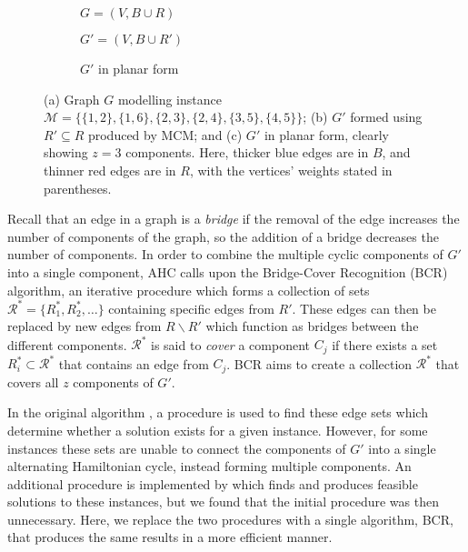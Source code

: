 \documentclass[authoryear]{elsarticle}
\begin{document}
\begin{figure}[H]	
	\centering
	\begin{subfigure}[h]{0.3\textwidth}
		
		\caption{$G = (V, B \cup R)$}
		\label{fig:threshold}
	\end{subfigure} \hspace{5mm}
	\begin{subfigure}[h]{0.3\textwidth}
		
		\caption{$G' = (V, B \cup R')$}
		\label{fig:matching}
	\end{subfigure} \hspace{5mm}
	\begin{subfigure}[h]{0.243\textwidth}
		
		\caption{$G'$ in planar form}
		\label{fig:mps}
	\end{subfigure}
	\caption{(a) Graph $G$ modelling instance $\mathcal{M} = \{\{1,2\}, \{1,6\}, \{2,3\}, \{2,4\}, \{3,5\}, \{4,5\}\}$; (b) $G'$ formed using $R' \subseteq R$ produced by MCM; and (c) $G'$ in planar form, clearly showing $z = 3$ components. Here, thicker blue edges are in $B$, and thinner red edges are in $R$, with the vertices' weights stated in parentheses.}
	\label{fig:mcm}
\end{figure}

\noindent Recall that an edge in a graph is a \emph{bridge} if the removal of the edge increases the number of components of the graph, so the addition of a bridge decreases the number of components. In order to combine the multiple cyclic components of $G'$ into a single component, AHC calls upon the Bridge-Cover Recognition (BCR) algorithm, an iterative procedure which forms a collection of sets $\mathcal{R}^* = \{R^*_1, R^*_2, \dots\}$ containing specific edges from $R'$. These edges can then be replaced by new edges from $R\backslash R'$ which function as bridges between the different components. $\mathcal{R}^*$ is said to \emph{cover} a component $C_j$ if there exists a set $R^*_i \subset \mathcal{R}^*$ that contains an edge from $C_j$. BCR aims to create a collection $\mathcal{R}^*$ that covers all $z$ components of $G'$.

In the original algorithm \citep{becker2010}, a procedure is used to find these edge sets which determine whether a solution exists for a given instance. However, for some instances these sets are unable to connect the components of $G'$ into a single alternating Hamiltonian cycle, instead forming multiple components. An additional procedure is implemented by \citet{hawa2018} which finds and produces feasible solutions to these instances, but we found that the initial procedure was then unnecessary. Here, we replace the two procedures with a single algorithm, BCR, that produces the same results in a more efficient manner.
\end{document}
